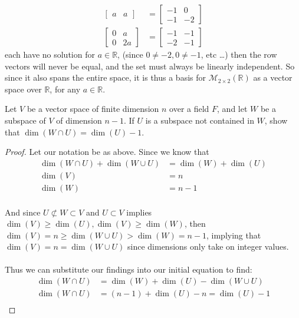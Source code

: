 \documentclass{article}
\begin{document}
\begin{solution}
\begin{align*}
\begin{bmatrix}
a	&	a
\end{bmatrix}
&= \begin{bmatrix}
-1	&	0	\\
-1	&	-2
\end{bmatrix}\\
\begin{bmatrix}
0	&	a	\\
0	&	2a
\end{bmatrix}
&= \begin{bmatrix}
-1	&	-1	\\
-2	&	-1
\end{bmatrix}
\end{align*}
each have no solution for $a \in \mathbb{R}$, (since $0\ne -2, 0\ne -1$, etc \dots) then the row vectors will never be equal, and the set must always be linearly independent. So since it also spans the entire space, it is thus a basis for $\mathcal{M}_{2\times 2}\left( \mathbb{R} \right)$ as a vector space over $\mathbb{R}$, for any $a\in\mathbb{R}$.
\end{solution}

\setcounter{problem}{201}
\begin{problem}\label{p202}
Let $V$ be a vector space of finite dimension $n$ over a field $F$, and let $W$ be a subspace of $V$ of dimension $n-1$. If $U$ is a subspace not contained in $W$, show that $\dim(W\cap U) = \dim(U)-1$.
\end{problem}

\begin{solution}\begin{proof}
Let our notation be as above. Since we know that 
\begin{align*}
\dim(W\cap U) + \dim(W\cup U)&= \dim(W) +\dim(U)\\
\dim(V) &= n\\
\dim(W) &= n-1
\end{align*}

\paragraph{}
And since $U\not\subset W\subset V$ and $U\subset V$ implies $\dim(V)\ge\dim(U),\dim(V)\ge\dim(W)$, then $\dim(V) = n \ge \dim(W\cup U) > \dim(W)=n-1$, 
implying that $\dim(V) = n = \dim(W\cup U)$ since dimensions only take on integer values.

\paragraph{}
Thus we can substitute our findings into our initial equation to find:
\begin{align*}
\dim(W\cap U) &= \dim(W) +\dim(U) -\dim(W\cup U)\\
\dim(W\cap U) &= (n-1) +\dim(U) -n = \dim(U)-1\\
\end{align*}
\end{proof}
\end{solution}
\end{document}
